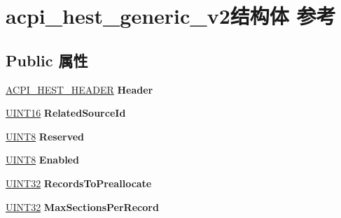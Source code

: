 \hypertarget{structacpi__hest__generic__v2}{}\section{acpi\+\_\+hest\+\_\+generic\+\_\+v2结构体 参考}
\label{structacpi__hest__generic__v2}
\subsection*{Public 属性}
\begin{DoxyCompactItemize}
\item 
\mbox{\label{structacpi__hest__generic__v2_a9c9868604635b60fa8b491da253c2bfd}} 
\hyperlink{structacpi__hest__header}{A\+C\+P\+I\+\_\+\+H\+E\+S\+T\+\_\+\+H\+E\+A\+D\+ER} {\bfseries Header}
\item 
\mbox{\label{structacpi__hest__generic__v2_a53bd466dfa7c68b75d07b20c57d347ed}} 
\hyperlink{_processor_bind_8h_a09f1a1fb2293e33483cc8d44aefb1eb1}{U\+I\+N\+T16} {\bfseries Related\+Source\+Id}
\item 
\mbox{\label{structacpi__hest__generic__v2_a16aae95d91ab11460c3bf946652c2eea}} 
\hyperlink{_processor_bind_8h_ab27e9918b538ce9d8ca692479b375b6a}{U\+I\+N\+T8} {\bfseries Reserved}
\item 
\mbox{\label{structacpi__hest__generic__v2_ad7f8953bf93fa1d0639b97def47b003c}} 
\hyperlink{_processor_bind_8h_ab27e9918b538ce9d8ca692479b375b6a}{U\+I\+N\+T8} {\bfseries Enabled}
\item 
\mbox{\label{structacpi__hest__generic__v2_ad14cd060eb3f05538d68f9b3ac130578}} 
\hyperlink{_processor_bind_8h_ae1e6edbbc26d6fbc71a90190d0266018}{U\+I\+N\+T32} {\bfseries Records\+To\+Preallocate}
\item 
\mbox{\label{structacpi__hest__generic__v2_ab4803e7543bfdb414fc23e11f313fcec}} 
\hyperlink{_processor_bind_8h_ae1e6edbbc26d6fbc71a90190d0266018}{U\+I\+N\+T32} {\bfseries Max\+Sections\+Per\+Record}
\item 
\mbox{\label{structacpi__hest__generic__v2_a60e8ad816a5a7dbaebf9d2edb29072f3}} 

\end{DoxyCompactItemize}
